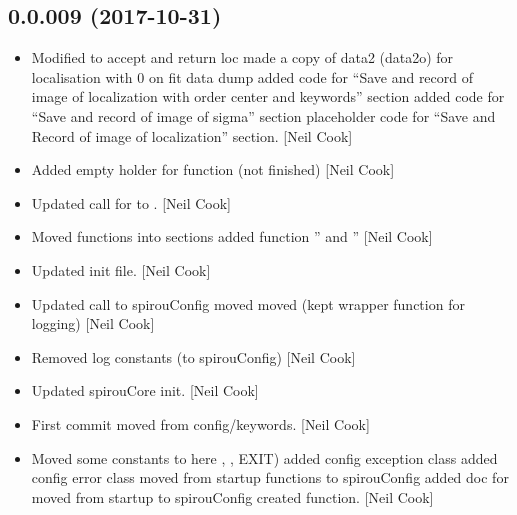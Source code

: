 \documentclass[a4paper,10pt,english]{report}
\begin{document}
\subsection{0.0.009 (2017-10-31)}
\label{\detokenize{misc/changelog:id542}}\begin{itemize}
\item {} 
Modified  to accept and
return loc made a copy of data2  (data2o) for localisation with 0 on
fit data dump added code for “Save and record of image of localization
with order center and keywords” section added code for “Save and
record of image of sigma” section placeholder code for “Save and
Record of image of localization” section. {[}Neil Cook{]}

\item {} 
Added empty holder for  function (not
finished) {[}Neil Cook{]}

\item {} 
Updated call for  to . {[}Neil Cook{]}

\item {} 
Moved functions into sections added function ” and
” {[}Neil Cook{]}

\item {} 
Updated init file. {[}Neil Cook{]}

\item {} 
Updated call to spirouConfig moved  moved
 (kept wrapper function for logging) {[}Neil Cook{]}

\item {} 
Removed log constants (to spirouConfig) {[}Neil Cook{]}

\item {} 
Updated spirouCore init. {[}Neil Cook{]}

\item {} 
First commit moved from config/keywords. {[}Neil Cook{]}

\item {} 
Moved some constants to here , , EXIT) added
config exception class added config error class moved
 from startup functions to spirouConfig added doc
for  moved  from startup to spirouConfig
created  function. {[}Neil Cook{]}


\end{itemize}
\end{document}
